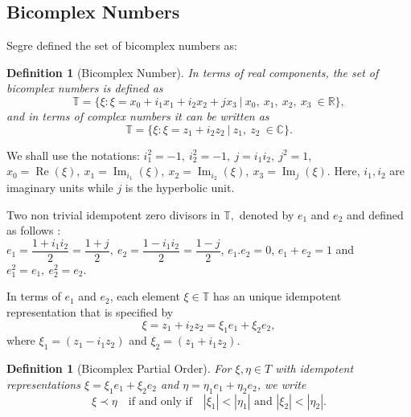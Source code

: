 \documentclass[a4paper,12pt]{article}
\newtheorem{definition}[theorem]{Definition}
\theoremstyle{remark}
\begin{document}
\subsection{Bicomplex Numbers}
Segre \cite{csegre1892} defined the set of bicomplex numbers as:
\begin{definition}[Bicomplex Number]
In terms of real components, the set of bicomplex numbers is defined as
\begin{equation}
\mathbb{T} =\{\xi: \xi = x_0 +i_1 x_1 +i_2 x_2 + j x_3~| ~x_0,~x_1,~x_2,~x_3~ \in \mathbb{R} \}, 	
\end{equation}
and in terms of complex numbers it can be written as
\begin{equation}\label{eq:bc}
\mathbb{T} = \{\xi: \xi =z_1 + i_2z_2~ |~z_1,~z_2 ~\in \mathbb{C}\}.	
\end{equation} 
\end{definition}
We shall use the  notations: $i_1^2=-1, ~i_2^2=-1,~ j=i_1i_2,~ j^2=1$, $x_0=\operatorname{Re}(\xi),~x_1=\operatorname{Im}_{i_1}(\xi),~x_2=\operatorname{Im}_{i_2}(\xi),~x_3=\operatorname{Im}_{j}(\xi).$  Here, $i_1,i_2$ are imaginary units while $j$ is the hyperbolic unit.
	

	

	
Two non trivial idempotent zero divisors in $\mathbb{T},$ denoted by $e_1$ and $e_2$ and defined as follows \cite{price1991}: \\
$	e_1 =  \dfrac{1 + i_1i_2}{2}=\dfrac{1+j}{2},~ e_2   =\dfrac  {1 - i_1i_2}{2} =\dfrac{1-j}{2}$, $e_1.e_2   = 0$,  $ e_1+ e_2 = 1$	   and $e_1^2=e_1,~e_2^2=e_2$.
	

In terms of $e_1$ and $e_2$, each element $\xi\in \mathbb{T}$ has an unique idempotent representation that is specified by
\begin{equation}\label{eq:idempotent def}
\xi = z_1 + i_2 z_2   =  \xi_1 e_1 + \xi_2 e_2,
\end{equation}  where  $\xi_1 = (z_1 - i_1 z_2)$ and $\xi_2 = (z_1 + i_1 z_2).$ \\

\begin{definition}[Bicomplex Partial Order]
\label{def:bicomplex_order}
For $\xi, \eta \in T$ with idempotent representations 
$\xi = \xi_1 e_1 + \xi_2 e_2$ and $\eta = \eta_1 e_1 + \eta_2 e_2$, 
we write 
\[
\xi \prec \eta \quad \text{if and only if} \quad |\xi_1| < |\eta_1| \text{ and } |\xi_2| < |\eta_2|.
\]
\end{definition}
\end{document}
